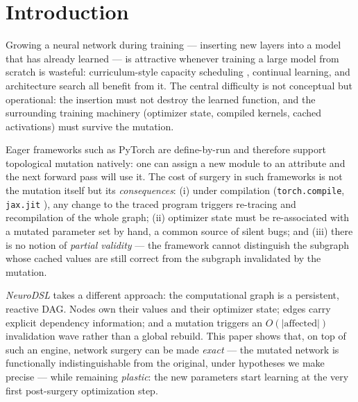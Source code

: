 \documentclass[11pt,a4paper]{article}
\begin{document}
\section{Introduction}

Growing a neural network during training --- inserting new layers into a model that has already learned --- is attractive whenever training a large model from scratch is wasteful: curriculum-style capacity scheduling \cite{stacking, bert2bert}, continual learning, and architecture search all benefit from it. The central difficulty is not conceptual but operational: the insertion must not destroy the learned function, and the surrounding training machinery (optimizer state, compiled kernels, cached activations) must survive the mutation.

Eager frameworks such as PyTorch \cite{pytorch} are define-by-run and therefore support topological mutation natively: one can assign a new module to an attribute and the next forward pass will use it. The cost of surgery in such frameworks is not the mutation itself but its \emph{consequences}: (i) under compilation (\texttt{torch.compile}, \texttt{jax.jit} \cite{jax}), any change to the traced program triggers re-tracing and recompilation of the whole graph; (ii) optimizer state must be re-associated with a mutated parameter set by hand, a common source of silent bugs; and (iii) there is no notion of \emph{partial validity} --- the framework cannot distinguish the subgraph whose cached values are still correct from the subgraph invalidated by the mutation.

\emph{NeuroDSL} \cite{neurodsl} takes a different approach: the computational graph is a persistent, reactive DAG. Nodes own their values and their optimizer state; edges carry explicit dependency information; and a mutation triggers an $O(|\text{affected}|)$ invalidation wave rather than a global rebuild. This paper shows that, on top of such an engine, network surgery can be made \emph{exact} --- the mutated network is functionally indistinguishable from the original, under hypotheses we make precise --- while remaining \emph{plastic}: the new parameters start learning at the very first post-surgery optimization step.
\end{document}
